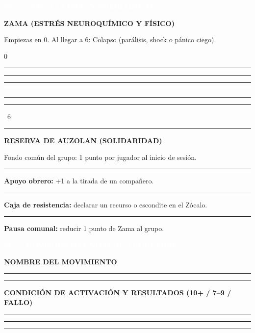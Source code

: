 \documentclass[10pt,a4paper,oneside]{book}
\newcommand{\rulefield}[2][\linewidth]{%
  \begin{minipage}[t]{#1}
  \textcolor{InkSoft}{\industrialfont\scriptsize\bfseries\MakeUppercase{#2}}\par
  \vspace{0.8mm}\textcolor{Line}{\rule{\linewidth}{0.45pt}}
  \end{minipage}}
\newcommand{\strip}[1]{%
  \vspace{0.8mm}\noindent
  \colorbox{CarbonDark}{\parbox{\dimexpr\linewidth-2\fboxsep\relax}{%
    \textcolor{white}{\industrialfont\bfseries\small\MakeUppercase{#1}}}}\par
  \vspace{0.8mm}}
\newcommand{\checkline}[2]{%
  \textcolor{#1}{\rule{2.4mm}{2.4mm}}\hspace{1mm}\textcolor{InkSoft}{\scriptsize #2}}
\begin{document}
\begin{minipage}[t]{0.48\linewidth}
  \strip{03 // Carga (Zama) y solidaridad}
  \begin{tcolorbox}[enhanced,colback=GoldPale,colframe=GoldDark,boxrule=.6pt,
    arc=0.8mm,left=4pt,right=4pt,top=2.5pt,bottom=2.5pt,height=44mm]
    {\industrialfont\bfseries\color{GoldDark}ZAMA (ESTRÉS NEUROQUÍMICO Y FÍSICO)}\par
    \textcolor{InkSoft}{\scriptsize Empiezas en 0. Al llegar a 6: Colapso (parálisis, shock o pánico ciego).}\par
    \vspace{2mm}
    \begin{center}
      \textcolor{InkSoft}{\scriptsize 0}\quad
      \checkline{AcidSirimiri}{}\quad
      \checkline{AcidSirimiri}{}\quad
      \checkline{AcidSirimiri}{}\quad
      \checkline{AcidSirimiri}{}\quad
      \checkline{AcidSirimiri}{}\quad
      \textcolor{OrekakRust}{\rule{2.8mm}{2.8mm}}\ \textcolor{OrekakRust}{\scriptsize 6}
    \end{center}
    \vspace{0.5mm}\textcolor{Line}{\rule{\linewidth}{.4pt}}\vspace{1mm}
    {\industrialfont\bfseries\color{GoldDark}RESERVA DE AUZOLAN (SOLIDARIDAD)}\par
    \textcolor{InkSoft}{\scriptsize Fondo común del grupo: 1 punto por jugador al inicio de sesión.}\par
    \vspace{0.5mm}
    {\color{InkSoft}\scriptsize
      \checkline{GoldDark}{} \textbf{Apoyo obrero:} +1 a la tirada de un compañero.\par\vspace{0.8mm}
      \checkline{GoldDark}{} \textbf{Caja de resistencia:} declarar un recurso o escondite en el Zócalo.\par\vspace{0.8mm}
      \checkline{GoldDark}{} \textbf{Pausa comunal:} reducir 1 punto de Zama al grupo.}
  \end{tcolorbox}
\end{minipage}

\strip{04 // Movimiento único de arquetipo}

\begin{tcolorbox}[enhanced,colback=RustPale,colframe=OrekakRust,boxrule=.6pt,
  arc=0.8mm,left=5pt,right=5pt,top=2.5pt,bottom=2.5pt]
  \begin{minipage}[t]{0.32\linewidth}
    \rulefield{Nombre del movimiento}\par\vspace{2mm}
    \textcolor{Line}{\rule{\linewidth}{.4pt}}
  \end{minipage}\hfill
  \begin{minipage}[t]{0.62\linewidth}
    \rulefield{Condición de activación y resultados (10+ / 7--9 / Fallo)}\par\vspace{2mm}
    \textcolor{Line}{\rule{\linewidth}{.4pt}}\par\vspace{2mm}
    \textcolor{Line}{\rule{\linewidth}{.4pt}}
  \end{minipage}
\end{tcolorbox}
\end{document}
